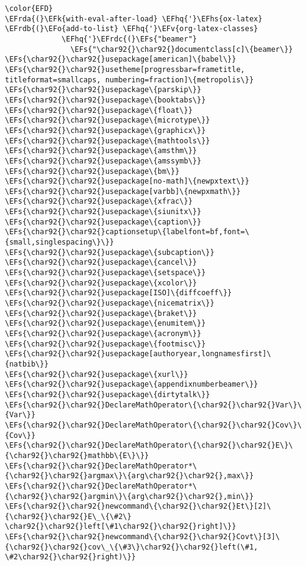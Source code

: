 \documentclass[12pt]{article}
\theoremstyle{plain}%
\theoremstyle{definition}
\theoremstyle{remark}
\newcommand{\EFs}[1]{\textcolor{EFs}{#1}} %
\newcommand{\EFk}[1]{\textcolor{EFk}{#1}} %
\newcommand{\EFv}[1]{\textcolor{EFv}{#1}} %
\newcommand{\EFo}[1]{\textcolor{EFo}{#1}} %
\newcommand{\EFhq}[1]{\textcolor{EFhq}{#1}} %
\newcommand{\EFhs}[1]{\textcolor{EFhs}{#1}} %
\newcommand{\EFrda}[1]{\textcolor{EFrda}{#1}} %
\newcommand{\EFrdb}[1]{\textcolor{EFrdb}{#1}} %
\newcommand{\EFrdc}[1]{\textcolor{EFrdc}{#1}} %
\begin{document}
\begin{Code}
\begin{Verbatim}
\color{EFD}
\EFrda{(}\EFk{with-eval-after-load} \EFhq{'}\EFhs{ox-latex}
\EFrdb{(}\EFo{add-to-list} \EFhq{'}\EFv{org-latex-classes}
             \EFhq{'}\EFrdc{(}\EFs{"beamer"}
               \EFs{"\char92{}\char92{}documentclass[c]\{beamer\}}
\EFs{\char92{}\char92{}usepackage[american]\{babel\}}
\EFs{\char92{}\char92{}usetheme[progressbar=frametitle, titleformat=smallcaps, numbering=fraction]\{metropolis\}}
\EFs{\char92{}\char92{}usepackage\{parskip\}}
\EFs{\char92{}\char92{}usepackage\{booktabs\}}
\EFs{\char92{}\char92{}usepackage\{float\}}
\EFs{\char92{}\char92{}usepackage\{microtype\}}
\EFs{\char92{}\char92{}usepackage\{graphicx\}}
\EFs{\char92{}\char92{}usepackage\{mathtools\}}
\EFs{\char92{}\char92{}usepackage\{amsthm\}}
\EFs{\char92{}\char92{}usepackage\{amssymb\}}
\EFs{\char92{}\char92{}usepackage\{bm\}}
\EFs{\char92{}\char92{}usepackage[no-math]\{newpxtext\}}
\EFs{\char92{}\char92{}usepackage[varbb]\{newpxmath\}}
\EFs{\char92{}\char92{}usepackage\{xfrac\}}
\EFs{\char92{}\char92{}usepackage\{siunitx\}}
\EFs{\char92{}\char92{}usepackage\{caption\}}
\EFs{\char92{}\char92{}captionsetup\{labelfont=bf,font=\{small,singlespacing\}\}}
\EFs{\char92{}\char92{}usepackage\{subcaption\}}
\EFs{\char92{}\char92{}usepackage\{cancel\}}
\EFs{\char92{}\char92{}usepackage\{setspace\}}
\EFs{\char92{}\char92{}usepackage\{xcolor\}}
\EFs{\char92{}\char92{}usepackage[ISO]\{diffcoeff\}}
\EFs{\char92{}\char92{}usepackage\{nicematrix\}}
\EFs{\char92{}\char92{}usepackage\{braket\}}
\EFs{\char92{}\char92{}usepackage\{enumitem\}}
\EFs{\char92{}\char92{}usepackage\{acronym\}}
\EFs{\char92{}\char92{}usepackage\{footmisc\}}
\EFs{\char92{}\char92{}usepackage[authoryear,longnamesfirst]\{natbib\}}
\EFs{\char92{}\char92{}usepackage\{xurl\}}
\EFs{\char92{}\char92{}usepackage\{appendixnumberbeamer\}}
\EFs{\char92{}\char92{}usepackage\{dirtytalk\}}
\EFs{\char92{}\char92{}DeclareMathOperator\{\char92{}\char92{}Var\}\{Var\}}
\EFs{\char92{}\char92{}DeclareMathOperator\{\char92{}\char92{}Cov\}\{Cov\}}
\EFs{\char92{}\char92{}DeclareMathOperator\{\char92{}\char92{}E\}\{\char92{}\char92{}mathbb\{E\}\}}
\EFs{\char92{}\char92{}DeclareMathOperator*\{\char92{}\char92{}argmax\}\{arg\char92{}\char92{},max\}}
\EFs{\char92{}\char92{}DeclareMathOperator*\{\char92{}\char92{}argmin\}\{arg\char92{}\char92{},min\}}
\EFs{\char92{}\char92{}newcommand\{\char92{}\char92{}Et\}[2]\{\char92{}\char92{}E\_\{\#2\} \char92{}\char92{}left[\#1\char92{}\char92{}right]\}}
\EFs{\char92{}\char92{}newcommand\{\char92{}\char92{}Covt\}[3]\{\char92{}\char92{}cov\_\{\#3\}\char92{}\char92{}left(\#1, \#2\char92{}\char92{}right)\}}

\end{Verbatim}
\end{Code}
\end{document}
